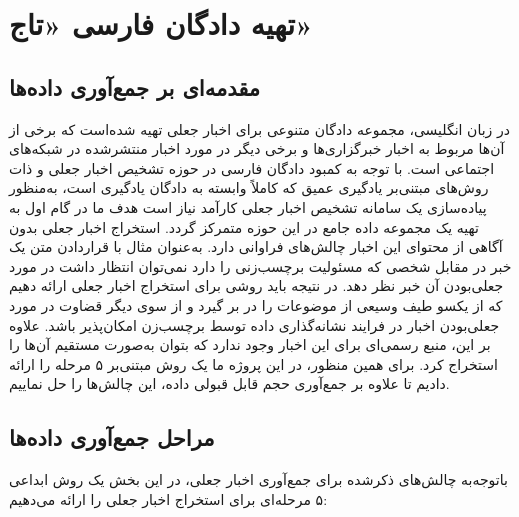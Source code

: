 \chapter{تهیه دادگان فارسی «تاج»}
\section{مقدمه‌ای بر جمع‌آوری داده‌ها}
در زبان انگلیسی، مجموعه‌ دادگان متنوعی برای اخبار جعلی تهیه شده‌است که برخی از آن‌ها مربوط به اخبار خبرگزاری‌ها و برخی دیگر در مورد اخبار منتشرشده در شبکه‌های اجتماعی است. با توجه به کمبود دادگان فارسی در حوزه تشخیص اخبار جعلی و ذات روش‌های مبتنی‌بر یادگیری عمیق که کاملاً وابسته به دادگان یادگیری است، به‌منظور پیاده‌سازی یک سامانه تشخیص اخبار جعلی کارآمد نیاز است هدف ما در گام اول به تهیه یک مجموعه داده جامع در این حوزه متمرکز گردد. استخراج اخبار جعلی بدون آگاهی از محتوای این اخبار چالش‌های فراوانی دارد. به‌عنوان مثال با قراردادن متن یک خبر در مقابل شخصی که مسئولیت برچسب‌زنی را دارد نمی‌توان انتظار داشت در مورد جعلی‌بودن آن خبر نظر دهد. در نتیجه باید روشی برای استخراج اخبار جعلی ارائه دهیم که از یکسو طیف وسیعی از موضوعات را در بر گیرد و از سوی دیگر قضاوت در مورد جعلی‌بودن اخبار در فرایند نشانه‌گذاری داده توسط برچسب‌زن امکان‌پذیر باشد. علاوه بر این، منبع رسمی‌ای برای این اخبار وجود ندارد که بتوان به‌صورت مستقیم آن‌ها را استخراج کرد. برای همین منظور، در این پروژه ما یک روش مبتنی‌بر ۵ مرحله را ارائه دادیم تا علاوه بر جمع‌آوری حجم قابل قبولی داده، این چالش‌ها را حل نماییم.

\section{مراحل جمع‌آوری داده‌ها}
باتوجه‌به چالش‌های ذکرشده برای جمع‌آوری اخبار جعلی، در این بخش  یک روش ابداعی ۵ مرحله‌ای برای استخراج  اخبار جعلی را ارائه  می‌دهیم:

